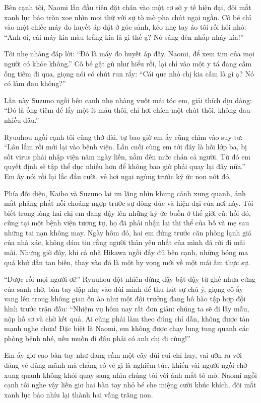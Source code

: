 ﻿\documentclass[../main.tex]{subfiles}
\begin{document}
Bên cạnh tôi, Naomi lần đầu tiên đặt chân vào một cơ sở y tế hiện đại, đôi mắt xanh lục bảo tròn xoe nhìn mọi thứ với sự tò mò pha chút ngại ngần. Cô bé chỉ vào một chiếc máy đo huyết áp đặt ở góc sảnh, kéo nhẹ tay áo tôi rồi hỏi nhỏ: ``Anh ơi, cái máy kia màu trắng kia là gì thế ạ? Nó sáng đèn nhấp nháy kìa!''

Tôi nhẹ nhàng đáp lời: ``Đó là máy đo huyết áp đấy, Naomi, để xem tim của mọi người có khỏe không.'' Cô bé gật gù như hiểu rồi, lại chỉ vào một y tá đang cầm ống tiêm đi qua, giọng nói có chút run rẩy: ``Cái que nhỏ chị kia cầm là gì ạ? Nó có làm đau không?''

Lần này Suzuno ngồi bên cạnh nhẹ nhàng vuốt mái tóc em, giải thích dịu dàng: ``Đó là ống tiêm để lấy một ít máu thôi, chỉ hơi chích một chút thôi, không đau nhiều đâu.''

Ryuuhou ngồi cạnh tôi cũng thở dài, tự bao giờ em ấy cũng chìm vào suy tư: ``Lâu lắm rồi mới lại vào bệnh viện. Lần cuối cùng em tới đây là hồi lớp ba, bị sốt virus phải nhập viện năm ngày liền, nằm đến mức chán cả người. Từ đó em quyết định sẽ tập thể dục nhiều hơn để không bao giờ phải quay lại đây nữa.'' Em ấy nói rồi lại lắc đầu cười, vẻ hơi ngại ngùng trước ký ức non nớt đó.

Phía đối diện, Kaiho và Suzuno lại im lặng nhìn khung cảnh xung quanh, ánh mắt phảng phất nỗi choáng ngợp trước sự đông đúc và hiện đại của nơi này. Tôi biết trong lòng hai chị em đang dậy lên những ký ức buồn ở thế giới cũ: hồi đó, cũng tại một bệnh viện tương tự, họ đã phải nhận lại thi thể của bố và mẹ sau những tai nạn không may. Ngày hôm đó, hai em đứng trước căn phòng lạnh giá của nhà xác, không dám tin rằng người thân yêu nhất của mình đã rời đi mãi mãi. Nhưng giờ đây, khi cả nhà Hikawa ngồi đầy đủ bên cạnh, những bóng ma quá khứ dần tan biến, thay vào đó là một hy vọng mới về một mái ấm thực sự.

``Được rồi mọi người ơi!'' Ryuuhou đột nhiên đứng dậy bật dậy từ ghế nhựa cứng của sảnh chờ, bàn tay đập nhẹ vào đùi mình để thu hút sự chú ý, giọng cô ấy vang lên trong không gian ồn ào như một đội trưởng đang hô hào tập hợp đội hình trước trận đấu: ``Nhiệm vụ hôm nay rất đơn giản: chúng ta sẽ đi lấy mẫu, nộp hồ sơ và chờ kết quả. Ai cũng phải làm theo đúng chỉ dẫn, không được tản mạnh nghe chưa! Đặc biệt là Naomi, em không được chạy lung tung quanh các phòng bệnh nhé, nếu muốn đi đâu phải có anh chị đi cùng!''

Em ấy giơ cao bàn tay như đang cầm một cây dùi cui chỉ huy, vai ưỡn ra với dáng vẻ dũng mãnh mà chẳng có vẻ gì là nghiêm túc, khiến vài người ngồi chờ xung quanh không khỏi quay sang nhìn chúng tôi với ánh mắt tò mò. Naomi ngồi cạnh tôi nghe vậy liền giơ hai bàn tay nhỏ bé che miệng cười khúc khích, đôi mắt xanh lục bảo nhíu lại thành hai vầng trăng non.
\end{document}

